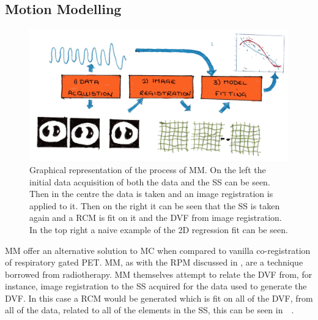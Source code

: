         \subsection{Motion Modelling} \label{sec:motion_modelling}
            \begin{figure}
                \centering
                        
                \includegraphics[width=1.0\linewidth]{figures/background_motion_model.png}
                        
                \captionsetup{singlelinecheck=false, justification=raggedright}
                \caption{Graphical representation of the process of \gls{MM}. On the left the initial data acquisition of both the data and the \gls{SS} can be seen. Then in the centre the data is taken and an image registration is applied to it. Then on the right it can be seen that the \gls{SS} is taken again and a \gls{RCM} is fit on it and the \gls{DVF} from image registration. In the top right a naive example of the \gls{2D} regression fit can be seen.} \label{fig:motion_modelling_motion_model}
            \end{figure}
            
            \gls{MM} offer an alternative solution to \gls{MC} when compared to vanilla co-registration of respiratory gated \gls{PET}. \gls{MM}, as with the \gls{RPM} discussed in , are a technique borrowed from radiotherapy. \gls{MM} themselves attempt to relate the \gls{DVF} from, for instance, image registration to the \gls{SS} acquired for the data used to generate the \gls{DVF}. In this case a \gls{RCM} would be generated which is fit on all of the \gls{DVF}, from all of the data, related to all of the elements in the \gls{SS}, this can be seen in~~.
            
